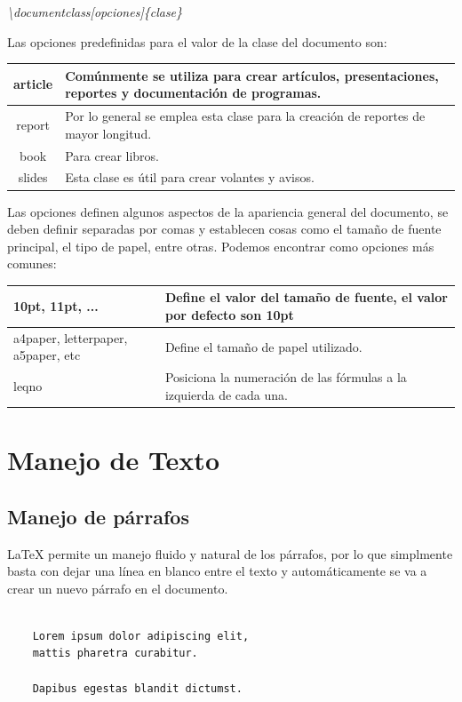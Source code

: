 \documentclass[journal]{IEEEtran}
\begin{document}
\begin{center}
  \emph{\textbackslash{}documentclass[opciones]\{clase\}}
\end{center}


Las opciones predefinidas para el valor de la clase del documento son:

\begin{tabular}[t]{|c|p{5cm}|}
  \hline
  article & Comúnmente se utiliza para crear artículos, presentaciones, reportes y documentación de programas. \\ \hline
  report & Por lo general se emplea esta clase para la creación de reportes de mayor longitud. \\ \hline
  book & Para crear libros. \\ \hline
  slides & Esta clase es útil para crear volantes y avisos. \\ \hline
\end{tabular}


Las opciones definen algunos aspectos de la apariencia general del documento, se deben
definir separadas por comas y establecen cosas como el tamaño de fuente principal, el tipo de papel, entre otras.
Podemos encontrar como opciones más comunes:
\begin{center}
  \begin{tabular}[t]{|m{2cm}|m{3cm}|}
    \hline
    10pt, 11pt, ... & Define el valor del tamaño de fuente, el valor por defecto son 10pt \\ \hline
    a4paper, letterpaper, a5paper, etc & Define el tamaño de papel utilizado. \\ \hline
    leqno & Posiciona la numeración de las fórmulas a la izquierda de cada una. \\ \hline
  \end{tabular}  
\end{center}




\section{Manejo de Texto}
\subsection{Manejo de párrafos}
\LaTeX\xspace  permite un manejo fluido y natural de los párrafos, por lo que simplmente basta con dejar una línea en blanco entre el texto y automáticamente se va a crear un nuevo párrafo en el documento.
\small{
\begin{center}
\begin{verbatim}
  
    Lorem ipsum dolor adipiscing elit, 
    mattis pharetra curabitur.
    
    Dapibus egestas blandit dictumst.
\end{verbatim}
\end{center}
}
\end{document}
